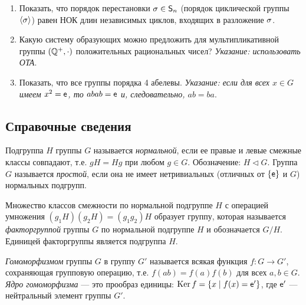 \begin{enumerate}
\item Показать, что порядок перестановки $\sigma\in{\mathsf{S}}_n$ (порядок циклической группы $\langle\sigma\rangle$) равен НОК длин независимых циклов, входящих в разложение $\sigma$.

\item Какую систему образующих можно предложить для мультипликативной группы $(\mathbb Q^+,\cdot)$ положительных рациональных чисел? \textsl{Указание: использовать ОТА}.

\item Показать, что все группы порядка 4 абелевы. \textsl{Указание: если для всех $x\in G$ имеем $x^2=\mathsf e$, то $abab=\mathsf e$ и, следовательно, $ab=ba$}.

\end{enumerate}

\subsection*{Справочные сведения}

Подгруппа $H$ группы $G$ называется \textit{нормальной}, если ее правые и левые смежные классы совпадают, т.е. $gH=Hg$ при любом $g\in G$. Обозначение: $H\triangleleft G$. Группа $G$ называется \textit{простой}, если она не имеет нетривиальных (отличных от $\{\mathsf e\}$ и $G$) нормальных подгрупп.

Множество классов смежности по нормальной подгруппе $H$ с операцией умножения $(g_1H)(g_2H)=(g_1g_2)H$ образует группу, которая называется \textit{факторгруппой} группы $G$ по нормальной подгруппе $H$ и обозначается $G/H$. Единицей факторгруппы является подгруппа $H$.

\textit{Гомоморфизмом} группы $G$ в группу $G'$ называется всякая функция $f:G\to G'$, сохраняющая групповую операцию, т.е. $f(ab)=f(a)f(b)$ для всех $a,b\in G$. \textit{Ядро гомоморфизма} --- это прообраз единицы: $\mathop{\mathrm{Ker}} f=\{x\mid f(x)=\mathsf e'\}$, где $\mathsf e'$ --- нейтральный элемент группы $G'$.

